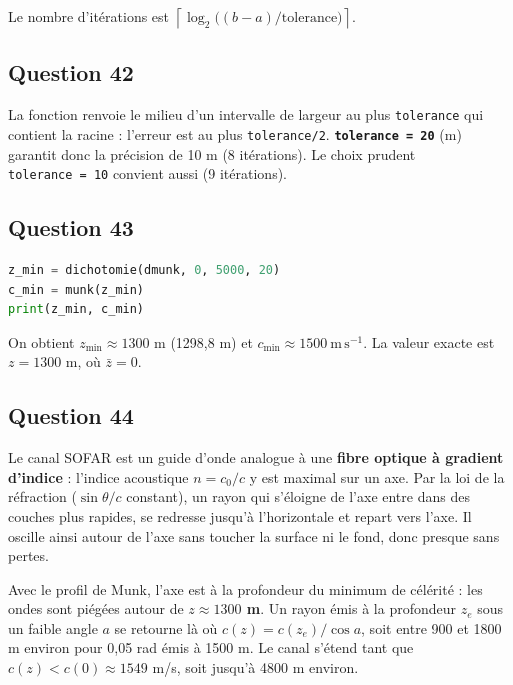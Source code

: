 \documentclass[11pt,a4paper]{article}
\begin{document}
Le nombre d'itérations est \(\left\lceil \log_2\big((b - a)/\text{tolerance}\big)\right\rceil\).

\hypertarget{question-42}{%
\subsection{Question 42}\label{question-42}}

La fonction renvoie le milieu d'un intervalle de largeur au plus \texttt{tolerance} qui contient la racine : l'erreur est au plus \texttt{tolerance/2}. \textbf{\texttt{tolerance\ =\ 20}} (m) garantit donc la précision de 10 m (8 itérations). Le choix prudent \texttt{tolerance\ =\ 10} convient aussi (9 itérations).

\hypertarget{question-43}{%
\subsection{Question 43}\label{question-43}}

\begin{lstlisting}[language=Python]
z_min = dichotomie(dmunk, 0, 5000, 20)
c_min = munk(z_min)
print(z_min, c_min)
\end{lstlisting}

On obtient \(z_{\min} \approx 1300\) m (1298,8 m) et \(c_{\min} \approx 1500\ \mathrm{m\,s^{-1}}\). La valeur exacte est \(z = 1300\) m, où \(\bar z = 0\).

\hypertarget{question-44}{%
\subsection{Question 44}\label{question-44}}

Le canal SOFAR est un guide d'onde analogue à une \textbf{fibre optique à gradient d'indice} : l'indice acoustique \(n = c_0/c\) y est maximal sur un axe. Par la loi de la réfraction (\(\sin\theta/c\) constant), un rayon qui s'éloigne de l'axe entre dans des couches plus rapides, se redresse jusqu'à l'horizontale et repart vers l'axe. Il oscille ainsi autour de l'axe sans toucher la surface ni le fond, donc presque sans pertes.

Avec le profil de Munk, l'axe est à la profondeur du minimum de célérité : les ondes sont piégées autour de \textbf{\(z \approx 1300\) m}. Un rayon émis à la profondeur \(z_e\) sous un faible angle \(a\) se retourne là où \(c(z) = c(z_e)/\cos a\), soit entre 900 et 1800 m environ pour 0,05 rad émis à 1500 m. Le canal s'étend tant que \(c(z) < c(0) \approx 1549\) m/s, soit jusqu'à 4800 m environ.
\end{document}
